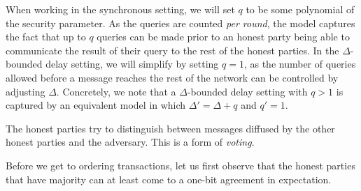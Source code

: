 When working in the synchronous setting, we will set $q$ to be some polynomial
of the security parameter. As the queries are counted \emph{per round}, the
model captures the fact that up to $q$ queries can be made prior to an honest
party being able to communicate the result of their query to the rest of the
honest parties. In the $\Delta$-bounded delay setting, we will simplify by
setting $q = 1$, as the number of queries allowed before a message reaches the
rest of the network can be controlled by adjusting $\Delta$. Concretely, we note
that a $\Delta$-bounded delay setting with $q > 1$ is captured by an equivalent
model in which $\Delta' = \Delta + q$ and $q' = 1$.

The honest parties try to distinguish between messages diffused by the other
honest parties and the adversary. This is a form of \emph{voting}.

Before we get to ordering transactions, let us first observe that the honest
parties that have majority can at least come to a one-bit agreement in
expectation.
